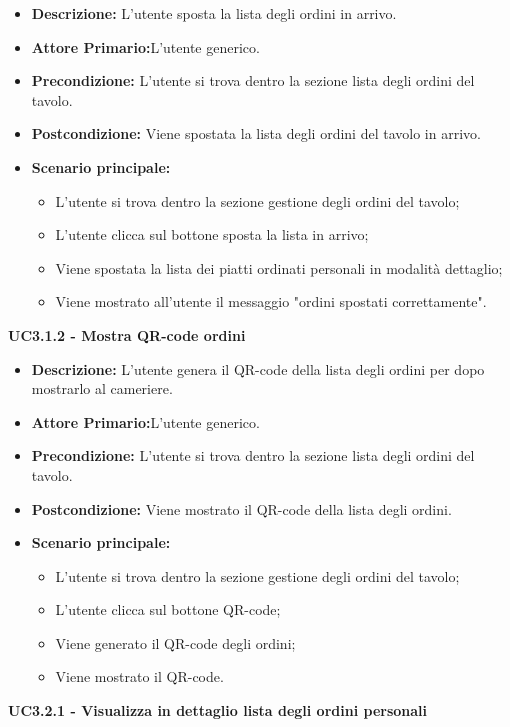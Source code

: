 \begin{itemize}
    \item \textbf{Descrizione:} L'utente sposta la lista degli ordini in arrivo.
    \item \textbf{Attore Primario:}L'utente generico.
    \item \textbf{Precondizione:} L'utente si trova dentro la sezione lista degli ordini del tavolo.
    \item \textbf{Postcondizione:} Viene spostata la lista degli ordini del tavolo in arrivo.
    \item \textbf{Scenario principale:}
    \begin{itemize}
        \item L'utente si trova dentro la sezione gestione degli ordini del tavolo;
        \item L'utente clicca sul bottone sposta la lista in arrivo;
        \item Viene spostata la lista dei piatti ordinati personali in modalità dettaglio;
        \item Viene mostrato all'utente il messaggio "ordini spostati correttamente".
    \end{itemize}
\end{itemize}
\textbf{UC3.1.2 - Mostra QR-code ordini}
\begin{itemize}
    \item \textbf{Descrizione:} L'utente genera il QR-code della lista degli ordini per dopo mostrarlo al cameriere.
    \item \textbf{Attore Primario:}L'utente generico.
    \item \textbf{Precondizione:} L'utente si trova dentro la sezione lista degli ordini del tavolo.
    \item \textbf{Postcondizione:} Viene mostrato il QR-code della lista degli ordini.
    \item \textbf{Scenario principale:}
    \begin{itemize}
        \item L'utente si trova dentro la sezione gestione degli ordini del tavolo;
        \item L'utente clicca sul bottone QR-code;
        \item Viene generato il QR-code degli ordini;
        \item Viene mostrato il QR-code.
    \end{itemize}
\end{itemize}
\textbf{UC3.2.1 - Visualizza in dettaglio lista degli ordini personali}

